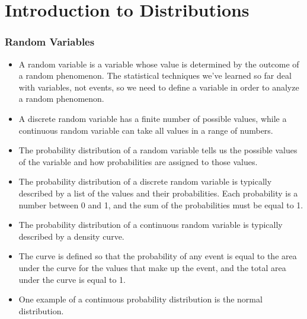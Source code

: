 \documentclass{beamer}
\begin{document}
\section{Introduction to Distributions}
\begin{frame}
\frametitle{Random Variables}
\begin{itemize}
\item A random variable is a variable whose value is determined by the outcome of a random phenomenon.
The statistical techniques we've learned so far deal with variables, not events, so we need to define a
variable in order to analyze a random phenomenon.
\item A discrete random variable has a finite number of possible values, while a continuous random variable
can take all values in a range of numbers.
\end{itemize}
\end{frame}
\begin{frame}

\begin{itemize}
\item The probability distribution of a random variable tells us the possible values of the variable and how
probabilities are assigned to those values.
\item The probability distribution of a discrete random variable is typically described by a list of the
values and their probabilities. Each probability is a number between 0 and 1, and the sum of the
probabilities must be equal to 1.
\end{itemize}
\end{frame}

\begin{frame}
\Large
\begin{itemize}
\item The probability distribution of a continuous random variable is typically described by a density
curve. \item The curve is defined so that the probability of any event is equal to the area under the
curve for the values that make up the event, and the total area under the curve is equal to 1. \item One
example of a continuous probability distribution is the normal distribution.
\end{itemize}
\end{frame}
\end{document}
